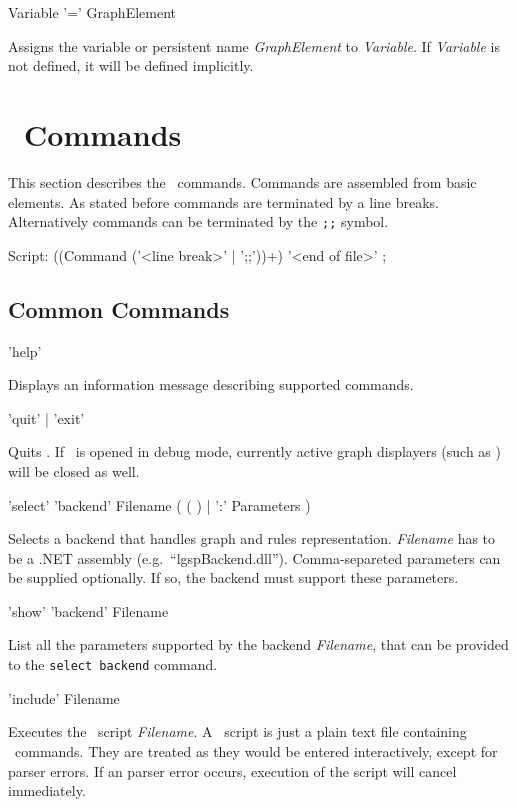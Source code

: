 \begin{rail}
  Variable '=' GraphElement   
\end{rail}
Assigns the variable or persistent name \emph{GraphElement} to \emph{Variable}. If \emph{Variable} is not defined, it will be defined implicitly.

\section{\GrShell\ Commands}
This section describes the \GrShell\ commands. Commands are assembled from basic elements. As stated before commands are terminated by a line breaks. Alternatively commands can be terminated by the \texttt{;;} symbol.
\begin{rail}
  Script: ((Command ('<line break>' | ';;'))+) '<end of file>' ;
\end{rail}

\subsection{Common Commands}
\label{commcommands}
\begin{rail}
  'help'
\end{rail}
Displays an information message describing supported commands. 

\begin{rail}
  'quit' | 'exit'
\end{rail}
Quits \GrShell. If \GrShell\ is opened in debug mode, currently active graph displayers (such as \yComp) will be closed as well.

\begin{rail}
  'select' 'backend' Filename ( ( ) | ':' Parameters )
\end{rail}
Selects a backend that handles graph and rules representation. \emph{Filename} has to be a .NET assembly (e.g.\ ``lgspBackend.dll'').  Comma-separeted parameters can be supplied optionally. If so, the backend must support these parameters.

\begin{rail}
  'show' 'backend' Filename
\end{rail}
List all the parameters supported by the backend \emph{Filename}, that can be provided to the \texttt{select backend} command.

\begin{rail}
  'include' Filename
\end{rail}
Executes the \GrShell\ script \emph{Filename}. A \GrShell\ script is just a plain text file containing \GrShell\ commands. They are treated as they would be entered interactively, except for parser errors. If an parser error occurs, execution of the script will cancel immediately.

